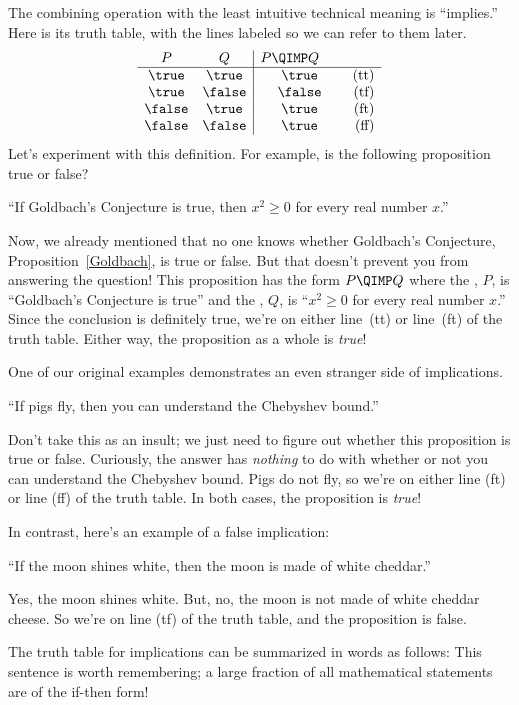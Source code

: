 The combining operation with the least intuitive technical meaning is
``implies.''  Here is its truth table, with the lines labeled so we can
refer to them later.
%
\[
\begin{array}{cc|cr}
    P  &   Q    & \parbox[b]{13ex}{$P \QIMP Q$} \\ \hline
\true  & \true  & \true & \text{(tt)}\\
\true  & \false & \false  & \text{(tf)}\\
\false & \true  & \true  & \text{(ft)}\\
\false & \false & \true  & \text{(ff)}
\end{array}
\]
Let's experiment with this definition.  For example, is the following
proposition true or false?
%
\begin{center}
``If Goldbach's Conjecture is true, then $x^2 \geq 0$ for every real
number $x$.''
\end{center}
%
Now, we already mentioned that no one knows whether Goldbach's Conjecture,
Proposition~\ref{Goldbach}, is true or false.  But that doesn't prevent
you from answering the question!  This proposition has the form $P
\QIMP Q$ where the , $P$, is ``Goldbach's Conjecture
is true'' and the , $Q$, is ``$x^2 \geq 0$ for every real
number $x$.''  Since the conclusion is definitely true, we're on either
line~(tt) or line~(ft) of the truth table.  Either way, the proposition as
a whole is \textit{true}!

One of our original examples demonstrates an even stranger side of
implications.
\begin{center}
``If pigs fly, then you can understand the Chebyshev bound.''
\end{center}
Don't take this as an insult; we just need to figure out whether this
proposition is true or false.  Curiously, the answer has \textit{nothing}
to do with whether or not you can understand the Chebyshev bound.  Pigs do
not fly, so we're on either line (ft) or line (ff) of the truth table.  In
both cases, the proposition is \textit{true}!

In contrast, here's an example of a false implication:
%
\begin{center}
``If the moon shines white, then the moon is made of white cheddar.''
\end{center}
%
Yes, the moon shines white.  But, no, the moon is not made of white
cheddar cheese.  So we're on line (tf) of the truth table, and the
proposition is false.

The truth table for implications can be summarized in words as
follows:
%
%
This sentence is worth remembering; a large fraction of all
mathematical statements are of the if-then form!

